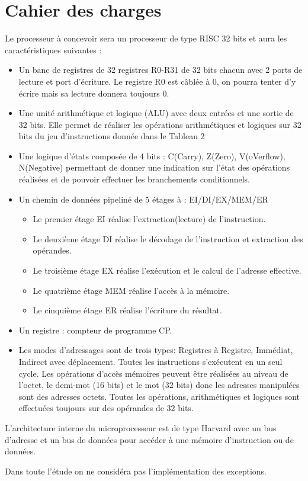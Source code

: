 \chapter{Cahier des charges}

Le processeur à concevoir sera un processeur de type RISC 32 bits et aura les caractéristiques suivantes :
\begin{itemize}
  \item Un banc de registres de 32 registres R0-R31 de 32 bits chacun avec 2 ports de lecture et port d'écriture. Le registre R0 est câblée à 0, on pourra tenter d'y écrire mais sa lecture donnera toujours 0.

  \item  Une unité arithmétique et logique (ALU) avec deux entrées et une sortie de 32 bits. Elle permet de réaliser les opérations arithmétiques et logiques sur 32 bits du jeu d'instructions donnée dans le Tableau 2

  \item Une logique d'états composée de 4 bits : C(Carry), Z(Zero), V(oVerflow), N(Negative) permettant de donner une indication sur l'état des opérations réalisées et de pouvoir effectuer les branchements conditionnels.

  \item Un chemin de données pipeliné de 5 étages à : EI/DI/EX/MEM/ER
    \begin{itemize}
      \item Le premier étage EI réalise l'extraction(lecture) de l'instruction.
      \item Le deuxième étage DI réalise le décodage de l'instruction et extraction des opérandes.
      \item Le troisième étage EX réalise l'exécution et le calcul de l'adresse effective. 
      \item Le quatrième étage MEM réalise l'accès à la mémoire.
      \item Le cinquième étage ER réalise l'écriture du résultat.
    \end{itemize}

  \item Un registre : compteur de programme CP. 

  \item Les modes d'adressages sont de trois types: Registres à Registre, Immédiat, Indirect avec déplacement. Toutes les instructions s'exécutent en un seul cycle. Les opérations d'accès mémoires peuvent être réalisées au niveau de l'octet, le demi-mot (16 bits) et le mot (32 bits) donc les adresses manipulées sont des adresses octets. Toutes les opérations, arithmétiques et logiques sont effectuées toujours sur des opérandes de 32 bits.
\end{itemize}

L'architecture interne du microprocesseur est de type Harvard avec un bus d'adresse et un bus de données pour accéder à une mémoire d'instruction ou de données.

Dans toute l'étude on ne considéra pas l'implémentation des exceptions. 

